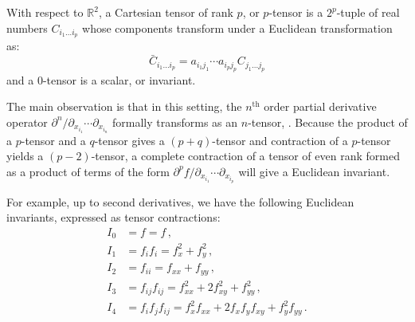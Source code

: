 \documentclass[review,onefignum,onetabnum]{siamonline190516}
\begin{document}
With respect to $\mathbb{R}^2$, a Cartesian tensor of rank $p$, or $p$-tensor is a $2^p$-tuple of real numbers $C_{i_1\ldots i_p}$ whose components transform under a Euclidean transformation as:
\begin{equation*}
  \bar{C}_{i_1\ldots i_p} = a_{i_1j_1}\cdots a_{i_pj_p} C_{j_1\ldots j_p}
\end{equation*}
and a $0$-tensor is a scalar, or invariant. 

The main observation is that in this setting, the $n^\text{th}$ order
partial derivative operator $\partial^n / \partial_{x_{i_1}}\cdots
\partial_{x_{i_n}}$ formally transforms as an $n$-tensor, \citep{Florack1993}. Because the product of a $p$-tensor and a $q$-tensor gives a $(p+q)$-tensor and contraction of a $p$-tensor yields a $(p-2)$-tensor, a complete contraction of a tensor of even rank formed as a product of terms of the form $\partial^p f / \partial_{x_{i_1}} \cdots \partial_{x_{i_p}}$ will give a Euclidean invariant.

For example, up to second derivatives, we have the following Euclidean invariants, expressed as tensor contractions:
\begin{equation}
\label{eq:e2tensor}
\begin{aligned}
  I_0 &= f = f \,,\\
  I_1 &= f_if_i = f_x^2 + f_y^2  \,,\\
  I_2 &= f_{ii} = f_{xx} + f_{yy} \,,\\
  I_3 &= f_{ij} f_{ij} = f_{xx}^2 + 2f_{xy}^2 + f_{yy}^2 \,,\\
  I_4 &= f_i f_j f_{ij} = f_x^2 f_{xx} + 2f_x f_y f_{xy} + f_y^2 f_{yy}\,.
\end{aligned}
\end{equation}
\end{document}
